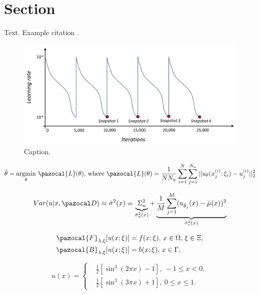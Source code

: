 \documentclass[thnuscript,10pt,number,sort&compress]{elsarticle}
\begin{document}
	
	
	
	{\footnotesize
		\setlength{\parskip}{0.1em}
		\linespread{0.1}
		\tableofcontents
		}
	
	\section{Section}\label{sec:label}
	
	Text. Example citation \cite{abdar2021review}.
	
	\begin{figure}[!ht]
		\centering
		\includegraphics[width=.6\linewidth]{./figs/fig.jpg}
		\caption{Caption.
		}
		\label{fig:label}
	\end{figure} 

	\begin{equation}\label{eq:label}
		\hat{\theta} =  \underset{\theta}{\mathrm{argmin}}~\pazocal{L}(\theta) \text{, where } 
		\pazocal{L}(\theta) = \frac{1}{NN_u}\sum_{i=1}^{N}\sum_{j=1}^{N_u}
		||u_{\theta}(x_j^{(i)}; \xi_i) - u_j^{(i)}||_2^2    
	\end{equation}

	\begin{equation}\label{eq:label}
		Var(u|x, \cD) \approx \bar{\sigma}^2(x) =  \underbrace{\Sigma_{u}^2}_{\bar{\sigma}_a^2(x)}  + \underbrace{\frac{1}{M}\sum_{j=1}^M(u_{\hat{\theta}_j}(x)-\bar{\mu}(x))^2}_{\bar{\sigma}_e^2(x)}
	\end{equation} 
	
	\begin{subequations}\label{eq:label}
		\begin{align}
			\pazocal{F}_{\lambda, \xi}[u(x; \xi)] &= f(x; \xi) \text{, } x \in  \Omega\text{, } \xi \in \Xi, 
			\label{eq:label:a}\\
			\pazocal{B}_{\lambda, \xi}[u(x; \xi)] & = b(x; \xi) \text{, } x \in \Gamma, 
			\label{eq:label:b}
		\end{align}
	\end{subequations}
	
	\begin{equation}\label{eq:label}
		u(x) = \left\{
		\begin{aligned}
			&\frac{1}{2}[\sin^3(2 \pi x) - 1], ~ -1 \le x < 0, \\
			&\frac{1}{2}[\sin^3(3 \pi x) + 1], ~ 0 \le x \le 1.
		\end{aligned}
		\right.
	\end{equation}
\end{document}
